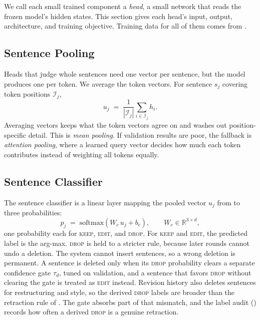 \documentclass[]{paper}
\newcommand{\keep}{\textsc{keep}}
\newcommand{\edit}{\textsc{edit}}
\newcommand{\drop}{\textsc{drop}}
\begin{document}
We call each small trained component a \emph{head}, a small network that reads the frozen model's hidden states. This section gives each head's input, output, architecture, and training objective. Training data for all of them comes from .

\subsection{Sentence Pooling}
\label{sec:pooling}

Heads that judge whole sentences need one vector per sentence, but the model produces one per token. We average the token vectors. For sentence $s_j$ covering token positions $\mathcal{I}_j$,
\begin{equation}
u_j \;=\; \frac{1}{|\mathcal{I}_j|} \sum_{i \in \mathcal{I}_j} h_i .
\label{eq:pool}
\end{equation}
Averaging vectors keeps what the token vectors agree on and washes out position-specific detail. This is \emph{mean pooling}. If validation results are poor, the fallback is \emph{attention pooling}, where a learned query vector decides how much each token contributes instead of weighting all tokens equally.

\subsection{Sentence Classifier}
\label{sec:cls}

The sentence classifier is a linear layer mapping the pooled vector $u_j$ from  to three probabilities:
\begin{equation}
p_j \;=\; \mathrm{softmax}\!\left(W_c\, u_j + b_c\right),
\qquad W_c \in \mathbb{R}^{3 \times d},
\label{eq:cls}
\end{equation}
one probability each for \keep{}, \edit{}, and \drop{}. For \keep{} and \edit{}, the predicted label is the arg-max. \drop{} is held to a stricter rule, because later rounds cannot undo a deletion. The system cannot insert sentences, so a wrong deletion is permanent. A sentence is deleted only when its \drop{} probability clears a separate confidence gate $\tau_d$, tuned on validation, and a sentence that favors \drop{} without clearing the gate is treated as \edit{} instead. Revision history also deletes sentences for restructuring and style, so the derived \drop{} labels are broader than the retraction rule of . The gate absorbs part of that mismatch, and the label audit () records how often a derived \drop{} is a genuine retraction.
\end{document}
